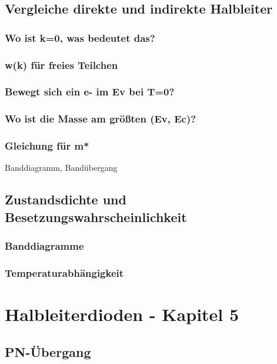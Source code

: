 \documentclass{article}
\begin{document}
\subsection{Vergleiche direkte und indirekte Halbleiter }\label{k4:inUndIndirekt}
    \subsubsection{Wo ist k=0, was bedeutet das?}
    \subsubsection{w(k) für freies Teilchen}
    \subsubsection{Bewegt sich ein e- im Ev bei T=0?}
    \subsubsection{Wo ist die Masse am größten (Ev, Ec)?}
    \subsubsection{Gleichung für m*}

Banddiagramm, Band\"ubergang
\subsection{Zustandsdichte und Besetzungswahrscheinlichkeit }\label{k4:zustandsDichte}
    \subsubsection{Banddiagramme}
    \subsubsection{Temperaturabh\"angigkeit}

\section{Halbleiterdioden - Kapitel 5}
\subsection{PN-Übergang }\label{k5:pn}
\end{document}
